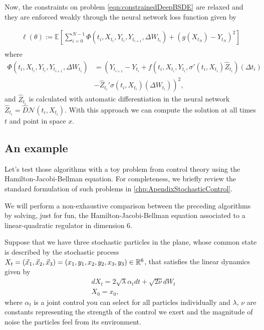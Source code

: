 Now, the constraints on problem \eqref{eqn:constrainedDeepBSDE} are relaxed and they are enforced weakly through the neural network loss function given by

\begin{equation}
	\begin{gathered}
		\ell(\theta):=\mathbb{E}\left[\sum_{i=0}^{N-1} \Phi\left(t_i, X_{t_i}, Y_{t_i}, Y_{t_{i+1}}, \Delta W_{t_{i}}\right)+\left(g\left(X_{t_N}\right)-Y_{t_N}\right)^2\right] \\
	\end{gathered}
\end{equation}
where 
\begin{equation}
	\begin{split}
		\Phi\left(t_i, X_{t_i}, Y_{t_i}, Y_{t_{i+1}}, \Delta W_{t_i}\right)&=\left(Y_{t_{i+1}}-Y_{t_i}+f\left(t_i, X_{t_i}, Y_{t_i}, \sigma'\left(t_i, X_{t_i}\right) \widehat{Z}_{t_i}\right)\left(\Delta t_i\right)\right. \\
		&\left.-\widehat{Z}_{t_i}' \sigma\left(t_i, X_{t_i}\right)\left(\Delta W_{t_i}\right)\right)^2,
	\end{split}
\end{equation}
and $\widehat{Z}_{t_i}$ is calculated with automatic differentiation in the neural network $\widehat{Z}_{t_i}=\hat{D}\mathcal{N}(t_i,X_{t_i})$. With this approach we can compute the solution at all times $t$ and point in space $x$.
\subsection{An example}
Let's test those algorithms with a toy problem from control theory using the Hamilton-Jacobi-Bellman equation. For completeness, we briefly review the standard formulation of such problems in \autoref{chp:ApendixStochasticControl}.


We will perform a non-exhaustive comparison between the preceding algorithms by solving, just for fun, the Hamilton-Jacobi-Bellman equation associated to a linear-quadratic regulator in dimension 6.

Suppose that we have three stochastic particles in the plane, whose common state is described by the stochastic process $X_t=(\vec{x}_1,\vec{x}_2,\vec{x}_3)=(x_1,y_1,x_2,y_2,x_3,y_3)\in\mathbb{R}^6$, that satisfies the linear dynamics given by 
\begin{equation}
	\begin{split}
		&dX_t=2\sqrt{\lambda}\alpha_t dt+\sqrt{2\nu}dW_t\\
		&X_0=x_0,
	\end{split} 
\end{equation} 
where $\alpha_t$ is a joint control you can select for all particles individually and $\lambda$, $\nu$ are constants representing the strength of the control we exert and the magnitude of noise the particles feel from its environment.  

